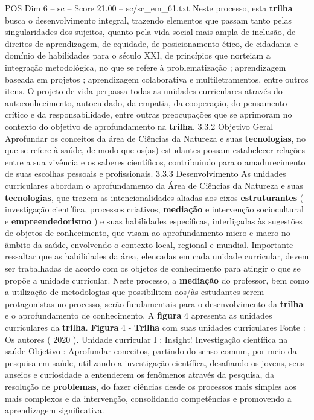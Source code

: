 \begin{textsample}{POS Dim 6 – sc – Score 21.00 – sc/sc\_em\_61.txt}
Neste processo, esta \textbf{trilha} busca o desenvolvimento integral, trazendo elementos que passam tanto pelas singularidades dos sujeitos, quanto pela vida social mais ampla de inclusão, de direitos de aprendizagem, de equidade, de posicionamento ético, de cidadania e domínio de habilidades para o século XXI, de princípios que norteiam a integração metodológica, no que se refere à problematização ; aprendizagem baseada em projetos ; aprendizagem colaborativa e multiletramentos, entre outros itens.
O projeto de vida perpassa todas as unidades curriculares através do autoconhecimento, autocuidado, da empatia, da cooperação, do pensamento crítico e da responsabilidade, entre outras preocupações que se aprimoram no contexto do objetivo de aprofundamento na \textbf{trilha}. 3.3.2 Objetivo Geral Aprofundar os conceitos da área de Ciências da Natureza e suas \textbf{tecnologias}, no que se refere à saúde, de modo que os(as) estudantes possam estabelecer relações entre a sua vivência e os saberes científicos, contribuindo para o amadurecimento de suas escolhas pessoais e profissionais. 3.3.3 Desenvolvimento As unidades curriculares abordam o aprofundamento da Área de Ciências da Natureza e suas \textbf{tecnologias}, que trazem as intencionalidades aliadas aos eixos \textbf{estruturantes} ( investigação científica, processos criativos, \textbf{mediação} e intervenção sociocultural e \textbf{empreendedorismo} ) e suas habilidades específicas, interligadas às sugestões de objetos de conhecimento, que visam ao aprofundamento micro e macro no âmbito da saúde, envolvendo o contexto local, regional e mundial.
Importante ressaltar que as habilidades da área, elencadas em cada unidade curricular, devem ser trabalhadas de acordo com os objetos de conhecimento para atingir o que se propõe a unidade curricular.
Neste processo, a \textbf{mediação} do professor, bem como a utilização de metodologias que possibilitem aos/às estudantes serem protagonistas no processo, serão fundamentais para o desenvolvimento da \textbf{trilha} e o aprofundamento de conhecimento.
A \textbf{figura} 4 apresenta as unidades curriculares da \textbf{trilha}. \textbf{Figura} 4 - \textbf{Trilha} com suas unidades curriculares Fonte : Os autores ( 2020 ).
Unidade curricular I : Insight!
Investigação científica na saúde Objetivo : Aprofundar conceitos, partindo do senso comum, por meio da pesquisa em saúde, utilizando a investigação científica, desafiando os jovens, seus anseios e curiosidade a entenderem os fenômenos através da pesquisa, da resolução de \textbf{problemas}, do fazer ciências desde os processos mais simples aos mais complexos e da intervenção, consolidando competências e promovendo a aprendizagem significativa.

\end{textsample}
